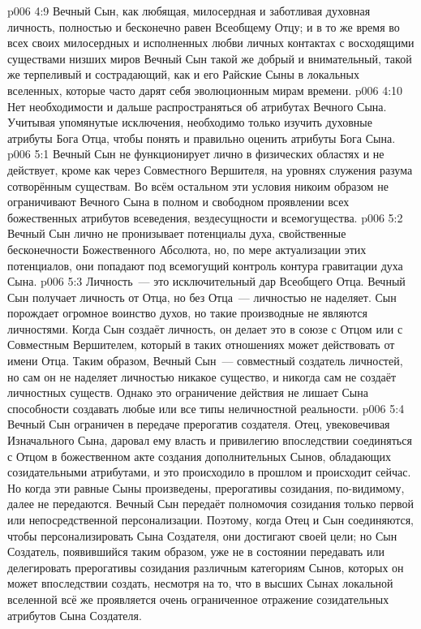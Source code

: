 \vs p006 4:9 \pc Вечный Сын, как любящая, милосердная и заботливая духовная личность, полностью и бесконечно равен Всеобщему Отцу; и в то же время во всех своих милосердных и исполненных любви личных контактах с восходящими существами низших миров Вечный Сын такой же добрый и внимательный, такой же терпеливый и сострадающий, как и его Райские Сыны в локальных вселенных, которые часто дарят себя эволюционным мирам времени.
\vs p006 4:10 Нет необходимости и дальше распространяться об атрибутах Вечного Сына. Учитывая упомянутые исключения, необходимо только изучить духовные атрибуты Бога Отца, чтобы понять и правильно оценить атрибуты Бога Сына.
\vs p006 5:1 Вечный Сын не функционирует лично в физических областях и не действует, кроме как через Совместного Вершителя, на уровнях служения разума сотворённым существам. Во всём остальном эти условия никоим образом не ограничивают Вечного Сына в полном и свободном проявлении всех божественных атрибутов  всеведения, вездесущности и всемогущества.
\vs p006 5:2 Вечный Сын лично не пронизывает потенциалы духа, свойственные бесконечности Божественного Абсолюта, но, по мере актуализации этих потенциалов, они попадают под всемогущий контроль контура гравитации духа Сына.
\vs p006 5:3 Личность~--- это исключительный дар Всеобщего Отца. Вечный Сын получает личность от Отца, но без Отца~--- личностью не наделяет. Сын порождает огромное воинство духов, но такие производные не являются личностями. Когда Сын создаёт личность, он делает это в союзе с Отцом или с Совместным Вершителем, который в таких отношениях может действовать от имени Отца. Таким образом, Вечный Сын~--- совместный создатель личностей, но сам он не наделяет личностью никакое существо, и никогда сам не создаёт личностных существ. Однако это ограничение действия не лишает Сына способности создавать любые или все типы неличностной реальности.
\vs p006 5:4 Вечный Сын ограничен в передаче прерогатив создателя. Отец, увековечивая Изначального Сына, даровал ему власть и привилегию впоследствии соединяться с Отцом в божественном акте создания дополнительных Сынов, обладающих созидательными атрибутами, и это происходило в прошлом и происходит сейчас. Но когда эти равные Сыны произведены, прерогативы созидания, по\hyp{}видимому, далее не передаются. Вечный Сын передаёт полномочия созидания только первой или непосредственной персонализации. Поэтому, когда Отец и Сын соединяются, чтобы персонализировать Сына Создателя, они достигают своей цели; но Сын Создатель, появившийся таким образом, уже не в состоянии передавать или делегировать прерогативы созидания различным категориям Сынов, которых он может впоследствии создать, несмотря на то, что в высших Сынах локальной вселенной всё же проявляется очень ограниченное отражение созидательных атрибутов Сына Создателя.
